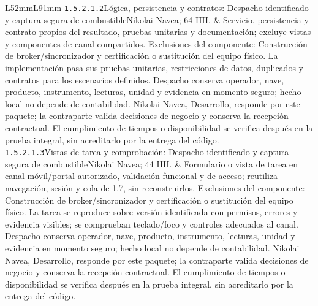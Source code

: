 \begin{longtable}{L{52mm}L{91mm}}
\texttt{1.\allowbreak{}5.\allowbreak{}2.\allowbreak{}1.\allowbreak{}2}\newline Lógica, persistencia y contratos: Despacho identificado y captura segura de combustible\newline Nikolai Navea; 64 HH. & Servicio, persistencia y contrato propios del resultado, pruebas unitarias y documentación; excluye vistas y componentes de canal compartidos. Exclusiones del componente: Construcción de broker/sincronizador y certificación o sustitución del equipo físico. La implementación pasa sus pruebas unitarias, restricciones de datos, duplicados y contratos para los escenarios definidos. Despacho conserva operador, nave, producto, instrumento, lecturas, unidad y evidencia en momento seguro; hecho local no depende de contabilidad. Nikolai Navea, Desarrollo, responde por este paquete; la contraparte valida decisiones de negocio y conserva la recepción contractual. El cumplimiento de tiempos o disponibilidad se verifica después en la prueba integral, sin acreditarlo por la entrega del código.\\\hline
\texttt{1.\allowbreak{}5.\allowbreak{}2.\allowbreak{}1.\allowbreak{}3}\newline Vistas de tarea y comprobación: Despacho identificado y captura segura de combustible\newline Nikolai Navea; 44 HH. & Formulario o vista de tarea en canal móvil/portal autorizado, validación funcional y de acceso; reutiliza navegación, sesión y cola de 1.7, sin reconstruirlos. Exclusiones del componente: Construcción de broker/sincronizador y certificación o sustitución del equipo físico. La tarea se reproduce sobre versión identificada con permisos, errores y evidencia visibles; se comprueban teclado/foco y controles adecuados al canal. Despacho conserva operador, nave, producto, instrumento, lecturas, unidad y evidencia en momento seguro; hecho local no depende de contabilidad. Nikolai Navea, Desarrollo, responde por este paquete; la contraparte valida decisiones de negocio y conserva la recepción contractual. El cumplimiento de tiempos o disponibilidad se verifica después en la prueba integral, sin acreditarlo por la entrega del código.\\\hline

\end{longtable}
